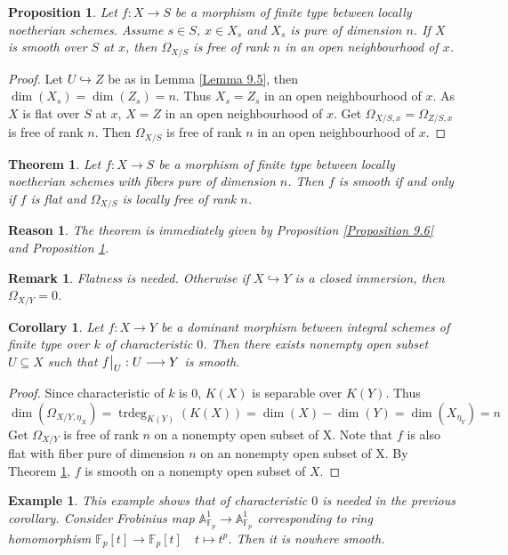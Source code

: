 \documentclass{ctexart}
\newtheorem{remark}{Remark}[section]
\newtheorem{theorem}{Theorem}[section]
\newtheorem{proposition}{Proposition}[section]
\newtheorem{reason}{Reason}[section]
\newtheorem{example}{Example}[section]
\newtheorem{corollary}{Corollary}[section]
\newcommand{\trdeg}{\operatorname{trdeg}}
\begin{document}
\begin{proposition}
    Let $f: X \longrightarrow S$ be a morphism of finite type between locally noetherian schemes.
    Assume $s\in S$, $x\in X_{s}$ and $X_{s}$ is pure of dimension $n$.
    If $X$ is smooth over $S$ at $x$, then $\Omega_{X/S}$ is free of rank $n$ in an open neighbourhood of $x$.
    \label{Proposition 9.7} 
\end{proposition}
\begin{proof}
    Let $U \hookrightarrow Z$ be as in Lemma \ref{Lemma 9.5}, then $\dim(X_{s}) = \dim(Z_{s}) = n$.
    Thus $X_{s} = Z_{s}$ in an open neighbourhood of $x$.
    As $X$ is flat over $S$ at $x$, $X = Z$ in an open neighbourhood of $x$.
    Get $\Omega_{X/S, x} = \Omega_{Z/S, x}$ is free of rank $n$.
    Then $\Omega_{X/S}$ is free of rank $n$ in an open neighbourhood of $x$.
\end{proof}
\begin{theorem}
    Let $f: X \longrightarrow S$ be a morphism of finite type between locally noetherian schemes with fibers pure of dimension $n$.
    Then $f$ is smooth if and only if $f$ is flat and $\Omega_{X/S}$ is locally free of rank $n$.
    \label{Theorem 9.1}
\end{theorem}
\begin{reason}
    The theorem is immediately given by Proposition \ref{Proposition 9.6} and Proposition \ref{Proposition 9.7}.
\end{reason}
\begin{remark}
    Flatness is needed.
    Otherwise if $X \hookrightarrow Y$ is a closed immersion, then $\Omega_{X/Y} = 0$.
\end{remark}
\begin{corollary}
    Let $f: X \longrightarrow Y$ be a dominant morphism between integral schemes of finite type over $k$ of characteristic $0$.
    Then there exists nonempty open subset $U \subseteq X$ such that $f\big{|}_{U}: U \longrightarrow Y$ is smooth.
    \label{Corollary 9.2}
\end{corollary}
\begin{proof}
    Since characteristic of $k$ is $0$, $K(X)$ is separable over $K(Y)$.
    Thus 
    \begin{equation*}
        \dim(\Omega_{X/Y, \eta_{X}}) = \trdeg_{K(Y)}(K(X)) = \dim(X) - \dim(Y) = \dim(X_{\eta_{Y}}) = n
    \end{equation*}
    Get $\Omega_{X/Y}$ is free of rank $n$ on a nonempty open subset of X.
    Note that $f$ is also flat with fiber pure of dimension $n$ on an nonempty open subset of X.
    By Theorem \ref{Theorem 9.1}, $f$ is smooth on a nonempty open subset of $X$.
\end{proof}
\begin{example}
    This example shows that of characteristic $0$ is needed in the previous corollary.
    Consider Frobinius map $\mathbb{A}_{\mathbb{F}_{p}}^{1} \longrightarrow \mathbb{A}_{\mathbb{F}_{p}}^{1}$ corresponding to ring homomorphism $\mathbb{F}_{p}[t] \longrightarrow \mathbb{F}_{p}[t]\quad t \longmapsto t^{p}$.
    Then it is nowhere smooth.
\end{example}
\end{document}
